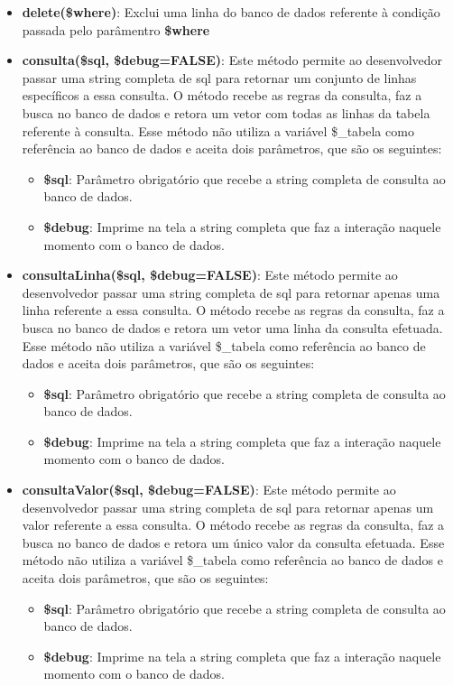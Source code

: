 \begin{itemize}
                \item\textbf{delete(\$where)}: Exclui uma linha do banco de dados referente à condição passada pelo parâmentro \textbf{\$where}

                \item\textbf{consulta(\$sql, \$debug=FALSE)}: Este método permite ao desenvolvedor passar uma string completa de sql para retornar um conjunto de linhas específicos a essa consulta. O método recebe as regras da consulta, faz a busca no banco de dados e retora um vetor com todas as linhas da tabela referente à consulta. Esse método não utiliza a variável \$\_tabela como referência ao banco de dados e aceita dois parâmetros, que são os seguintes:
                \begin{itemize}
                    \item\textbf{\$sql}: Parâmetro obrigatório que recebe a string completa de consulta ao banco de dados.
                    \item\textbf{\$debug}: Imprime na tela a string completa que faz a interação naquele momento com o banco de dados.
                \end{itemize}

                \item\textbf{consultaLinha(\$sql, \$debug=FALSE)}: Este método permite ao desenvolvedor passar uma string completa de sql para retornar apenas uma linha referente a essa consulta. O método recebe as regras da consulta, faz a busca no banco de dados e retora um vetor uma linha da consulta efetuada. Esse método não utiliza a variável \$\_tabela como referência ao banco de dados e aceita dois parâmetros, que são os seguintes:
                \begin{itemize}
                    \item\textbf{\$sql}: Parâmetro obrigatório que recebe a string completa de consulta ao banco de dados.
                    \item\textbf{\$debug}: Imprime na tela a string completa que faz a interação naquele momento com o banco de dados.
                \end{itemize}

                \item\textbf{consultaValor(\$sql, \$debug=FALSE)}: Este método permite ao desenvolvedor passar uma string completa de sql para retornar apenas um valor referente a essa consulta. O método recebe as regras da consulta, faz a busca no banco de dados e retora um único valor da consulta efetuada. Esse método não utiliza a variável \$\_tabela como referência ao banco de dados e aceita dois parâmetros, que são os seguintes:
                \begin{itemize}
                    \item\textbf{\$sql}: Parâmetro obrigatório que recebe a string completa de consulta ao banco de dados.
                    \item\textbf{\$debug}: Imprime na tela a string completa que faz a interação naquele momento com o banco de dados.
                \end{itemize}


\end{itemize}
